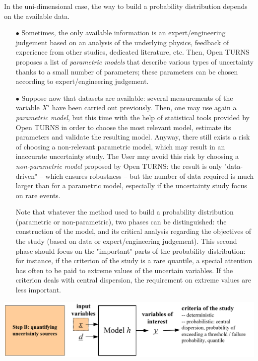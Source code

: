 In the uni-dimensional case, the way to build a probability distribution depends on the available data.

\begin{itemize}

\item[$\bullet$] Sometimes, the only available information is an expert/engineering judgement based on an analysis of the underlying physics, feedback of experience from other studies, dedicated literature, etc. Then, Open TURNS proposes a list of {\em parametric models} that describe various types of uncertainty thanks to a small number of parameters; these parameters can be chosen according to expert/engineering judgement.

\item[$\bullet$] Suppose now that datasets are available: several measurements of the variable $X^i$ have been carried out previously. Then, one may use again a {\em parametric model}, but this time with the help of statistical tools provided by Open TURNS in order to choose the most relevant model, estimate its parameters and validate the resulting model. Anyway, there still exists a risk of choosing a non-relevant parametric model, which may result in an inaccurate uncertainty study. The User may avoid this risk by choosing a  {\em non-parametric model} proposed by Open TURNS: the result is only "data-driven" -- which ensures robustness -- but the number of data required is much larger than for a parametric model, especially if the uncertainty study focus on rare events.

  Note that whatever the method used to build a probability distribution (parametric or non-parametric), two phases can be distinguished: the construction of the model, and its critical analysis regarding the objectives of the study (based on data or expert/engineering judgement). This second phase should focus on the "important" parts of the probability distribution: for instance, if the criterion of the study is a rare quantile, a special attention has often to be paid to extreme values of the uncertain variables. If the criterion deals with central dispersion, the requirement on extreme values are less important.

\end{itemize}

\begin{center}
  \includegraphics[scale=0.8]{flow3.pdf}
\end{center}

